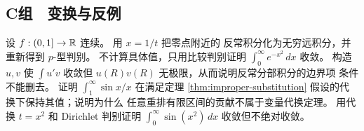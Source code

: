 \subsection*{C组　变换与反例}
\begin{enumerate}[label=\textbf{\thechapter.\arabic*.},resume]
  设 \(f:(0,1]\to\mathbb{R}\) 连续。
 用 \(x=1/t\) 把零点附近的
 反常积分化为无穷远积分，并重新得到 \(p\)-型判别。
  不计算具体值，只用比较判别证明
 \(\int_0^\infty e^{-x^2}\,dx\) 收敛。
  构造 \(u,v\) 使
 \(\int u'v\) 收敛但 \(u(R)v(R)\) 无极限，从而说明反常分部积分的边界项
 条件不能删去。
  证明
 \(\int_1^\infty\sin x/x\) 在满足定理 \ref{thm:improper-substitution}
 假设的代换下保持其值；说明为什么
 任意重排有限区间的贡献不属于变量代换定理。
  用代换 \(t=x^2\) 和
 Dirichlet 判别证明 \(\int_0^\infty\sin(x^2)\,dx\) 收敛但不绝对收敛。
\end{enumerate}
